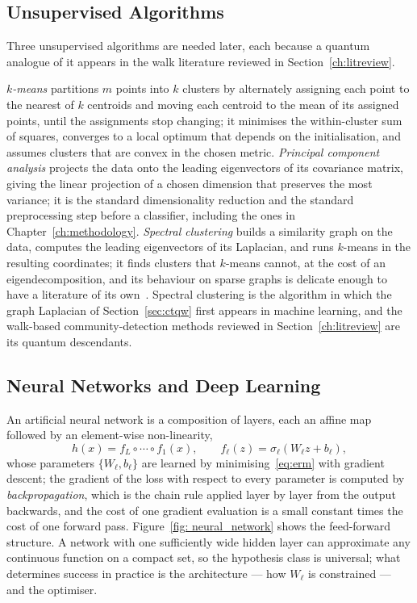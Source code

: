 \subsection{Unsupervised Algorithms}
\label{sec:ml-unsupervised}
Three unsupervised algorithms are needed later, each because a quantum
analogue of it appears in the walk literature reviewed in
Section~\ref{ch:litreview}.

\emph{$k$-means} partitions $m$ points into $k$ clusters by alternately
assigning each point to the nearest of $k$ centroids and moving each centroid
to the mean of its assigned points, until the assignments stop changing; it
minimises the within-cluster sum of squares, converges to a local optimum
that depends on the initialisation, and assumes clusters that are convex in
the chosen metric. \emph{Principal component analysis} projects the data onto
the leading eigenvectors of its covariance matrix, giving the linear
projection of a chosen dimension that preserves the most variance; it is the
standard dimensionality reduction and the standard preprocessing step before
a classifier, including the ones in Chapter~\ref{ch:methodology}.
\emph{Spectral clustering} builds a similarity graph on the data, computes
the leading eigenvectors of its Laplacian, and runs $k$-means in the
resulting coordinates; it finds clusters that $k$-means cannot, at the cost
of an eigendecomposition, and its behaviour on sparse graphs is delicate
enough to have a literature of its own~\cite{Krzakala_2013}. Spectral
clustering is the algorithm in which the graph Laplacian of
Section~\ref{sec:ctqw} first appears in machine learning, and the
walk-based community-detection methods reviewed in Section~\ref{ch:litreview}
are its quantum descendants.

\subsection{Neural Networks and Deep Learning}
\label{sec:ml-nn}
An artificial neural network is a composition of layers, each an affine map
followed by an element-wise non-linearity,
\begin{equation}
	h(x) = f_L \circ \cdots \circ f_1 (x), \qquad f_\ell(z) = \sigma_\ell(W_\ell z + b_\ell),
	\label{eq:mlp}
\end{equation}
whose parameters $\{W_\ell, b_\ell\}$ are learned by minimising~\eqref{eq:erm}
with gradient descent; the gradient of the loss with respect to every
parameter is computed by \emph{backpropagation}, which is the chain rule
applied layer by layer from the output backwards, and the cost of one
gradient evaluation is a small constant times the cost of one forward pass.
Figure~\ref{fig: neural_network} shows the feed-forward structure. A network
with one sufficiently wide hidden layer can approximate any continuous
function on a compact set, so the hypothesis class is universal; what
determines success in practice is the architecture --- how $W_\ell$ is
constrained --- and the optimiser.

